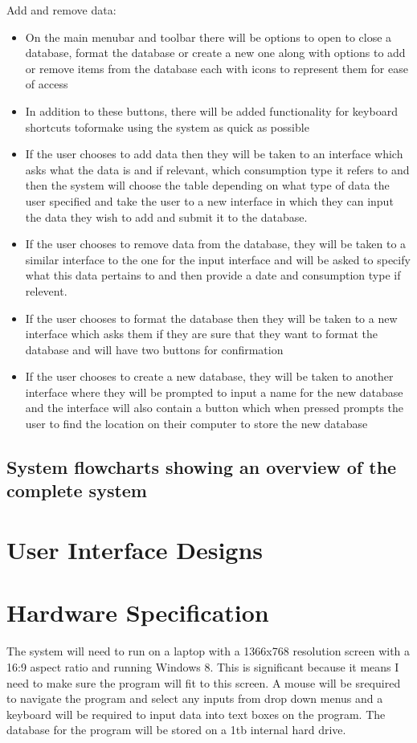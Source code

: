 Add and remove data:
\begin{itemize}
\item{On the main menubar and toolbar there will be options to open to close a database, format the database  or create a new one along with options to add or remove items from the database each with icons to represent them for ease of access}
\item{In addition to these buttons, there will be added functionality for keyboard shortcuts toformake using the system as quick as possible}
\item{If the user chooses to add data then they will be taken to an interface which asks what the data is and if relevant, which consumption type it refers to and then the system will choose the table depending on what type of data the user specified and take the user to a new interface in which they can input the data they wish to add and submit it to the database.}
\item{If the user chooses to remove data from the database, they will be taken to a similar interface to the one for the input interface and will be asked to specify what this data pertains to and then provide a date and consumption type if relevent.}
\item{If the user chooses to format the database then they will be taken to a new interface which asks them if they are sure that they want to format the database and will have two buttons for confirmation}
\item{If the user chooses to create a new database, they will be taken to another interface where they will be prompted to input a name for the new database and the interface will also contain a button which when pressed prompts the user to find the location on their computer to store the new database}
\end{itemize}

\subsection{System flowcharts showing an overview of the complete system}

\section{User Interface Designs}

\section{Hardware Specification}
The system will need to run on a laptop with a 1366x768 resolution screen with a 16:9  aspect ratio and running Windows 8. This is significant because it means I need to make sure the program will fit to this screen. A mouse will be srequired to navigate the program and select any inputs from drop down menus and a keyboard will be required to input data into text boxes on the program. The database for the program will be stored on a 1tb internal hard drive.
